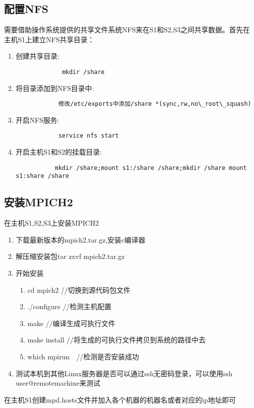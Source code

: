 \subsection{配置NFS}
    需要借助操作系统提供的共享文件系统NFS来在S1和S2,S3之间共享数据。首先在主机S1上建立NFS共享目录：
    \begin{enumerate} 
    \item  创建共享目录:
            
    \begin{verbatim}
             mkdir /share
    \end{verbatim}
    \item  将目录添加到NFS目录中:
    \begin{verbatim}
            修改/etc/exports中添加/share *(sync,rw,no\_root\_squash)
    \end{verbatim}
    \item  开启NFS服务:
    \begin{verbatim}
            service nfs start
    \end{verbatim}
    \item  开启主机S1和S2的挂载目录:
    \begin{verbatim}
           mkdir /share;mount s1:/share /share;mkdir /share mount s1:share /share
    \end{verbatim}
    \end{enumerate}
\subsection{安装MPICH2}
    在主机S1,S2,S3上安装MPICH2
    \begin{enumerate}
    \item 下载最新版本的mpich2.tar.gz,安装c编译器
    \item 解压缩安装包tar zxvf mpich2.tar.gz 
    \item 开始安装
            \begin{enumerate}
            \item cd mpich2  //切换到源代码包文件
            \item ./configure //检测主机配置
            \item make        //编译生成可执行文件
            \item make install //将生成的可执行文件拷贝到系统的路径中去
            \item which mpirun　//检测是否安装成功
            \end{enumerate}
    \item 测试本机到其他Linux服务器是否可以通过ssh无密码登录，可以使用ssh user@remotemachine来测试
    \end{enumerate}
    在主机S1创建mpd.hosts文件并加入各个机器的机器名或者对应的ip地址即可


